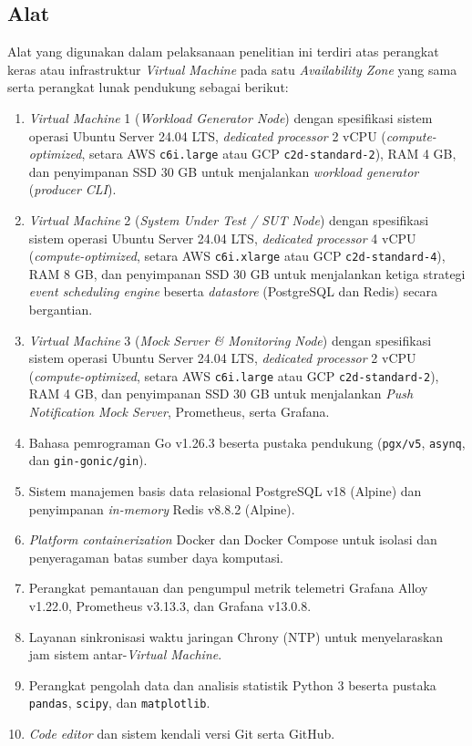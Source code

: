 \subsection{Alat} \label{III.Alat}
Alat yang digunakan dalam pelaksanaan penelitian ini terdiri atas perangkat keras atau infrastruktur \textit{Virtual Machine} pada satu \textit{Availability Zone} yang sama serta perangkat lunak pendukung sebagai berikut: \par
\begin{enumerate}[noitemsep]
	\item \textit{Virtual Machine} 1 (\textit{Workload Generator Node}) dengan spesifikasi sistem operasi Ubuntu Server 24.04 LTS, \textit{dedicated processor} 2 vCPU (\textit{compute-optimized}, setara AWS \texttt{c6i.large} atau GCP \texttt{c2d-standard-2}), RAM 4 GB, dan penyimpanan SSD 30 GB untuk menjalankan \textit{workload generator} (\textit{producer CLI}).
	\item \textit{Virtual Machine} 2 (\textit{System Under Test / SUT Node}) dengan spesifikasi sistem operasi Ubuntu Server 24.04 LTS, \textit{dedicated processor} 4 vCPU (\textit{compute-optimized}, setara AWS \texttt{c6i.xlarge} atau GCP \texttt{c2d-standard-4}), RAM 8 GB, dan penyimpanan SSD 30 GB untuk menjalankan ketiga strategi \textit{event scheduling engine} beserta \textit{datastore} (PostgreSQL dan Redis) secara bergantian.
	\item \textit{Virtual Machine} 3 (\textit{Mock Server \& Monitoring Node}) dengan spesifikasi sistem operasi Ubuntu Server 24.04 LTS, \textit{dedicated processor} 2 vCPU (\textit{compute-optimized}, setara AWS \texttt{c6i.large} atau GCP \texttt{c2d-standard-2}), RAM 4 GB, dan penyimpanan SSD 30 GB untuk menjalankan \textit{Push Notification Mock Server}, Prometheus, serta Grafana.
	\item Bahasa pemrograman Go v1.26.3 beserta pustaka pendukung (\texttt{pgx/v5}, \texttt{asynq}, dan \texttt{gin-gonic/gin}).
	\item Sistem manajemen basis data relasional PostgreSQL v18 (Alpine) dan penyimpanan \textit{in-memory} Redis v8.8.2 (Alpine).
	\item \textit{Platform containerization} Docker dan Docker Compose untuk isolasi dan penyeragaman batas sumber daya komputasi.
	\item Perangkat pemantauan dan pengumpul metrik telemetri Grafana Alloy v1.22.0, Prometheus v3.13.3, dan Grafana v13.0.8.
	\item Layanan sinkronisasi waktu jaringan Chrony (NTP) untuk menyelaraskan jam sistem antar-\textit{Virtual Machine}.
	\item Perangkat pengolah data dan analisis statistik Python 3 beserta pustaka \texttt{pandas}, \texttt{scipy}, dan \texttt{matplotlib}.
	\item \textit{Code editor} dan sistem kendali versi Git serta GitHub.
\end{enumerate}

